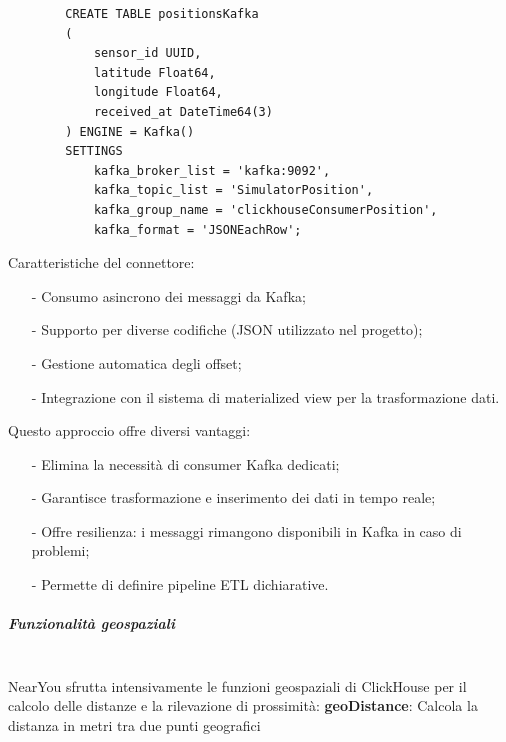 \documentclass[10pt]{article}
\newcommand{\mysubparagraph}[1]{\subparagraph{#1}\mbox{}\\}
\begin{document}
        \begin{lstlisting}
        CREATE TABLE positionsKafka
        (
            sensor_id UUID,
            latitude Float64,
            longitude Float64,
            received_at DateTime64(3)
        ) ENGINE = Kafka()
        SETTINGS
            kafka_broker_list = 'kafka:9092',
            kafka_topic_list = 'SimulatorPosition',
            kafka_group_name = 'clickhouseConsumerPosition',
            kafka_format = 'JSONEachRow';
        \end{lstlisting}

        Caratteristiche del connettore:
        \begin{itemize}
            \item[-] Consumo asincrono dei messaggi da Kafka;
            \item[-] Supporto per diverse codifiche (JSON utilizzato nel progetto);
            \item[-] Gestione automatica degli offset;
            \item[-] Integrazione con il sistema di materialized view per la trasformazione dati.
        \end{itemize}

        Questo approccio offre diversi vantaggi:
        \begin{itemize}
            \item[-] Elimina la necessità di consumer Kafka dedicati;
            \item[-] Garantisce trasformazione e inserimento dei dati in tempo reale;
            \item[-] Offre resilienza: i messaggi rimangono disponibili in Kafka in caso di problemi;
            \item[-] Permette di definire pipeline ETL dichiarative.
        \end{itemize}

        \mysubparagraph{Funzionalità geospaziali}
        NearYou sfrutta intensivamente le funzioni geospaziali di ClickHouse per il calcolo delle distanze e la rilevazione di prossimità:
        \textbf{geoDistance}: Calcola la distanza in metri tra due punti geografici
\end{document}
